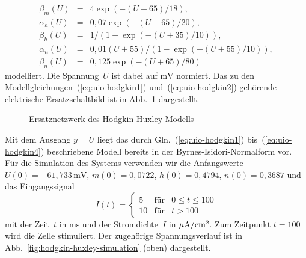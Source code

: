 \begin{example}
\begin{equation}
\begin{array}{lcl}
\beta_{m}(U) & = & 4\exp(-(U+65)/18),\\
\alpha_{h}(U) & = & 0,07\exp(-(U+65)/20),\\
\beta_{h}(U) & = & 1/(1+\exp(-(U+35)/10)),\\
\alpha_{n}(U) & = & 0,01(U+55)/(1-\exp(-(U+55)/10)),\\
\beta_{n}(U) & = & 0,125\exp(-(U+65)/80)
\end{array}\label{eq:uio-hodgkin4}
\end{equation}
modelliert. Die Spannung~$U$ ist dabei auf $\text{mV}$ normiert.
Das zu den Modellgleichungen~(\ref{eq:uio-hodgkin1}) und~(\ref{eq:uio-hodgkin2})
gehörende elektrische Ersatzschaltbild ist in Abb.~\ref{fig:hodgkin-huxley-netzwerk}
dargestellt.

\begin{figure}
\begin{centering}
\resizebox{0.5\textwidth}{!}{}
\par\end{centering}
\caption{Ersatznetzwerk des Hodgkin-Huxley-Modells\label{fig:hodgkin-huxley-netzwerk}}

\end{figure}

Mit dem Ausgang $y=U$ liegt das durch Gln.~(\ref{eq:uio-hodgkin1})
bis~(\ref{eq:uio-hodgkin4}) beschriebene Modell bereits in der Byrnes-Isidori-Normalform
vor. Für die Simulation des Systems verwenden wir die Anfangswerte
$U(0)=-61,733\,\text{mV}$, $m(0)=0,0722$, $h(0)=0,4794$, $n(0)=0,3687$
und das Eingangssignal
\[
I(t)=\left\{ \begin{array}{rcl}
5 & \text{für} & 0\leq t\leq100\\
10 & \text{für} & t>100
\end{array}\right.
\]
mit der Zeit~$t$ in $\text{ms}$ und der Stromdichte~$I$ in $\text{\ensuremath{\mu}A}/\text{cm}^{2}$.
Zum Zeitpunkt $t=100$ wird die Zelle stimuliert. Der zugehörige Spannungsverlauf
ist in Abb.~\ref{fig:hodgkin-huxley-simulation} (oben) dargestellt.


\end{example}
